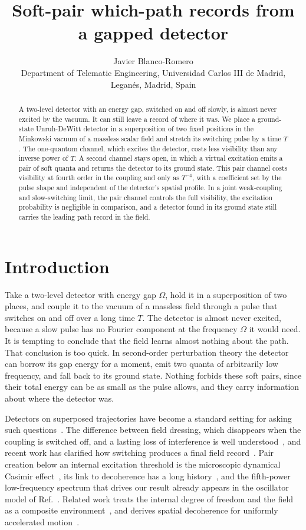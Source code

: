 \documentclass[11pt,a4paper]{article}
\title{Soft-pair which-path records from a gapped detector}
\author{Javier Blanco-Romero\\\small Department of Telematic Engineering, Universidad Carlos III de Madrid,\\Legan\'es, Madrid, Spain}
\date{}
\begin{document}
\maketitle
\begin{abstract}
A two-level detector with an energy gap, switched on and off slowly, is almost never excited by the vacuum. It can still leave a record of where it was. We place a ground-state Unruh-DeWitt detector in a superposition of two fixed positions in the Minkowski vacuum of a massless scalar field and stretch its switching pulse by a time $T$. The one-quantum channel, which excites the detector, costs less visibility than any inverse power of $T$. A second channel stays open, in which a virtual excitation emits a pair of soft quanta and returns the detector to its ground state. This pair channel costs visibility at fourth order in the coupling and only as $T^{-4}$, with a coefficient set by the pulse shape and independent of the detector's spatial profile. In a joint weak-coupling and slow-switching limit, the pair channel controls the full visibility, the excitation probability is negligible in comparison, and a detector found in its ground state still carries the leading path record in the field.
\end{abstract}

\section{Introduction}

Take a two-level detector with energy gap $\Omega$, hold it in a superposition of two places, and couple it to the vacuum of a massless field through a pulse that switches on and off over a long time $T$. The detector is almost never excited, because a slow pulse has no Fourier component at the frequency $\Omega$ it would need. It is tempting to conclude that the field learns almost nothing about the path. That conclusion is too quick. In second-order perturbation theory the detector can borrow its gap energy for a moment, emit two quanta of arbitrarily low frequency, and fall back to its ground state. Nothing forbids these soft pairs, since their total energy can be as small as the pulse allows, and they carry information about where the detector was.

Detectors on superposed trajectories have become a standard setting for asking such questions~\cite{Foo2020,Gooding2026}. The difference between field dressing, which disappears when the coupling is switched off, and a lasting loss of interference is well understood~\cite{Unruh2000,GundhiBassi2023}, and recent work has clarified how switching produces a final field record~\cite{Gundhi2024,GundhiUlbricht2025}. Pair creation below an internal excitation threshold is the microscopic dynamical Casimir effect~\cite{Souza2018,LoLaw2018,Farias2019}, its link to decoherence has a long history~\cite{Dalvit2000}, and the fifth-power low-frequency spectrum that drives our result already appears in the oscillator model of Ref.~\cite{Farias2019}. Related work treats the internal degree of freedom and the field as a composite environment~\cite{Sinha2021}, and derives spatial decoherence for uniformly accelerated motion~\cite{Jakubec2026}.
\end{document}

